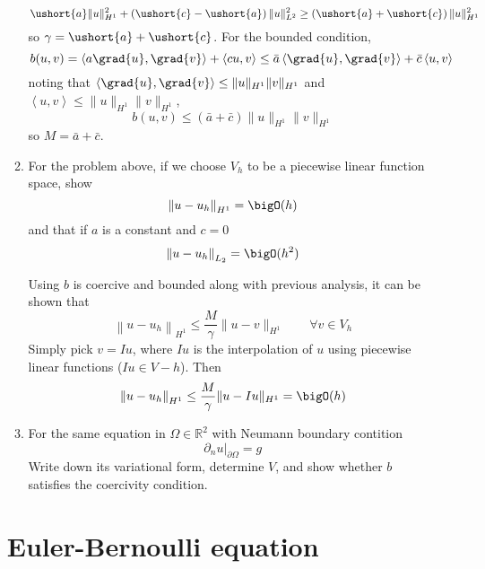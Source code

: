 \documentclass{article}
\newcommand\NoIndent[1]{%
  \begingroup
  \par
  \parshape0
  #1\par
  \endgroup
}
\begin{document}
\begin{enumerate}
\begin{enumerate}
{\begin{equation*}
			\ushort{a}\|u\|_{H^1}^2 + \left(\ushort{c}-\ushort{a}\right)\|u\|_{L^2}^2 \geq
			\left(\ushort{a}+\ushort{c}\right)\|u\|_{H^1}^2
	\end{equation*}
	so $\gamma = \ushort{a}+\ushort{c}$.
	For the bounded condition,
	\begin{equation*}
		b(u,v) = \left<a\grad{u},\grad{v}\right> + \left<cu,v\right> \leq
			\bar{a}\left<\grad{u},\grad{v}\right> + \bar{c}\left<u,v\right>
	\end{equation*}
	noting that $\left<\grad{u},\grad{v}\right> \leq \|u\|_{H^1}\|v\|_{H^1}$
	and $\left<u,v\right> \leq \|u\|_{H^1}\|v\|_{H^1}$,
	\begin{equation*}
		b(u,v) \leq \left(\bar{a}+\bar{c}\right)\|u\|_{H^1}\|v\|_{H^1}
	\end{equation*}
	so $M = \bar{a}+\bar{c}$.
}
			\item For the problem above, if we choose $V_h$ to be a piecewise linear function space, show
				\begin{equation*}
					\left\|u - u_h\right\|_{H^1} = \bigO(h)
				\end{equation*}
				and that if $a$ is a constant and $c = 0$
				\begin{equation*}
					\left\|u - u_h\right\|_{L_2} = \bigO(h^2)
				\end{equation*}
\NoIndent{
	Using $b$ is coercive and bounded along with previous analysis, it can be shown that
	\begin{equation*}
		\left\|u - u_h\right\|_{H^1} \leq \frac{M}{\gamma}\|u - v\|_{H^1} \qquad \forall v \in V_h
	\end{equation*}
	Simply pick $v = Iu$, where $Iu$ is the interpolation of $u$
	using piecewise linear functions ($Iu \in V-h$).
	Then
	\begin{equation*}
		\left\|u - u_h\right\|_{H^1} \leq \frac{M}{\gamma}\|u - Iu\|_{H^1} = \bigO(h)
	\end{equation*}
}
			\item For the same equation in $\Omega \in \mathbb{R}^2$ with Neumann boundary contition
				\begin{equation*}
					\left.\partial_n u\right|_{\partial\Omega} = g
				\end{equation*}
				Write down its variational form, determine $V$,
				and show whether $b$ satisfies the coercivity condition.
		\end{enumerate}

\NoIndent{\section{Euler-Bernoulli equation}}


\end{enumerate}
\end{document}
